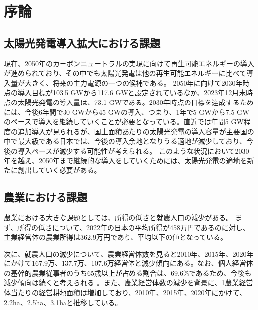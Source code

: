 \documentclass[uplatex,dvipdfmx,nomag,a4paper,oneside,onecolumn,12pt]{bxjsreport} %
\begin{document}




\frontmatter

\tableofcontents 

\mainmatter

\pagestyle{plain}
\chapter{序論}

\section{太陽光発電導入拡大における課題}
現在、2050年のカーボンニュートラルの実現に向けて再生可能エネルギーの導入が進められており、その中でも太陽光発電は他の再生可能エネルギーに比べて導入量が大きく、将来の主力電源の一つの候補である。
2050年に向けて2030年時点の導入目標が103.5 GWから117.6 GWと設定されているなか、2023年12月末時点の太陽光発電の導入量は、73.1 GWである。2030年時点の目標を達成するためには、今後6年間で30 GWから45 GWの導入、つまり、1年で5 GWから7.5 GWのペースで導入を継続していくことが必要となっている。直近では年間5 GW程度の追加導入が見られるが、国土面積あたりの太陽光発電の導入容量が主要国の中で最大級である日本では、今後の導入余地となりうる適地が減少しており、今後の導入ペースが減少する可能性が考えられる\cite{Keisansho2024}。
このような状況において2030年を越え、2050年まで継続的な導入をしていくためには、太陽光発電の適地を新たに創出していく必要がある。


\section{農業における課題}
農業における大きな課題としては、所得の低さと就農人口の減少がある。
まず、所得の低さについて、2022年の日本の平均所得が458万円である\cite{Minkankyuyo2022}のに対し、主業経営体の農業所得は362.9万円であり、平均以下の値となっている\cite{Nogyokeiei2024}。

次に、就農人口の減少について、農業経営体数を見ると2010年、2015年、2020年にかけて167.9万、137.7万、107.6万経営体と減少傾向にある。なお、個人経営体の基幹的農業従事者のうち65歳以上が占める割合は、69.6\%であるため、今後も減少傾向は続くと考えられる
\cite{Noringyo2020}。また、農業経営体数の減少を背景に、1農業経営体当たりの経営耕地面積は増加しており、2010年、2015年、2020年にかけて、2.2ha、2.5ha、3.1haと推移している。
\end{document}
